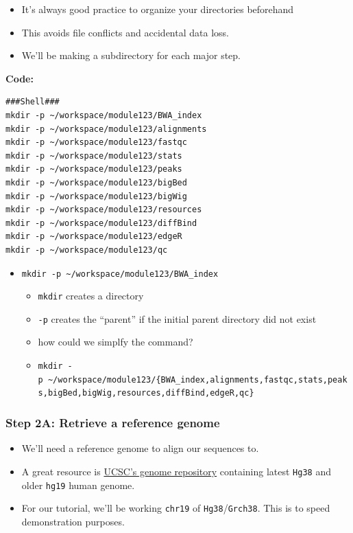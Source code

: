 \documentclass[
]{book}
\providecommand{\tightlist}{%
  \setlength{\itemsep}{0pt}\setlength{\parskip}{0pt}}
\begin{document}
\begin{itemize}
\tightlist
\item
  It's always good practice to organize your directories beforehand
\item
  This avoids file conflicts and accidental data loss.
\item
  We'll be making a subdirectory for each major step.
\end{itemize}

\textbf{Code:}

\begin{verbatim}
###Shell###
mkdir -p ~/workspace/module123/BWA_index
mkdir -p ~/workspace/module123/alignments
mkdir -p ~/workspace/module123/fastqc
mkdir -p ~/workspace/module123/stats
mkdir -p ~/workspace/module123/peaks
mkdir -p ~/workspace/module123/bigBed
mkdir -p ~/workspace/module123/bigWig
mkdir -p ~/workspace/module123/resources
mkdir -p ~/workspace/module123/diffBind
mkdir -p ~/workspace/module123/edgeR
mkdir -p ~/workspace/module123/qc
\end{verbatim}

\begin{itemize}
\tightlist
\item
  \texttt{mkdir\ -p\ \textasciitilde{}/workspace/module123/BWA\_index}

  \begin{itemize}
  \tightlist
  \item
    \texttt{mkdir} creates a directory
  \item
    \texttt{-p} creates the ``parent'' if the initial parent directory did not exist
  \item
    how could we simplfy the command?
  \item
    \texttt{mkdir\ -p\ \textasciitilde{}/workspace/module123/\{BWA\_index,alignments,fastqc,stats,peaks,bigBed,bigWig,resources,diffBind,edgeR,qc\}}
  \end{itemize}
\end{itemize}

\subsubsection{Step 2A: Retrieve a reference genome}\label{step-2a-retrieve-a-reference-genome}

\begin{itemize}
\tightlist
\item
  We'll need a reference genome to align our sequences to.
\item
  A great resource is \href{https://hgdownload.soe.ucsc.edu/downloads.html}{UCSC's genome repository} containing latest \texttt{Hg38} and older \texttt{hg19} human genome.
\item
  For our tutorial, we'll be working \texttt{chr19} of \texttt{Hg38}/\texttt{Grch38}. This is to speed demonstration purposes.
\end{itemize}
\end{document}
